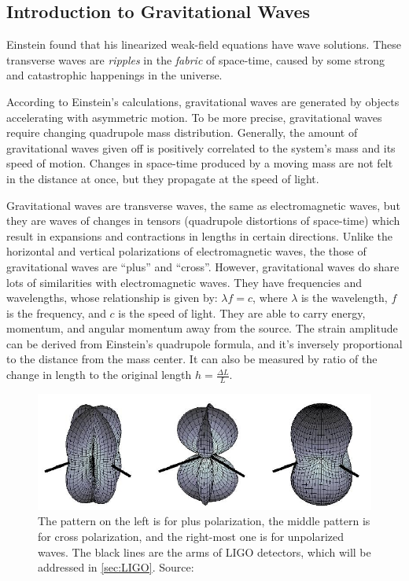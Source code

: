 \documentclass[aps,prd,preprint]{revtex4}
\begin{document}
\subsection{Introduction to Gravitational Waves}
Einstein found that his linearized weak-field equations have wave solutions. \cite{O1} These transverse waves are \emph{ripples} in the \emph{fabric} of space-time, caused by some strong and catastrophic happenings in the universe.
\par According to Einstein's calculations, gravitational waves are generated by objects accelerating with asymmetric motion. To be more precise, gravitational waves require changing quadrupole mass distribution. Generally, the amount of gravitational waves given off is positively correlated to the system's mass and its speed of motion. Changes in space-time produced by a moving mass are not felt in the distance at once, but they propagate at the speed of light. \cite{SBackground}
\par Gravitational waves are transverse waves, the same as electromagnetic waves, but they are waves of changes in tensors (quadrupole distortions of space-time) which result in expansions and contractions in lengths in certain directions. Unlike the horizontal and vertical polarizations of electromagnetic waves, the those of gravitational waves are \enquote{plus} and \enquote{cross}. However, gravitational waves do share lots of similarities with electromagnetic waves. They have frequencies and wavelengths, whose relationship is given by: $\lambda f=c$, where $\lambda$ is the wavelength, $f$ is the frequency, and $c$ is the speed of light. They are able to carry energy, momentum, and angular momentum away from the source. \cite{SBackground} The strain amplitude can be derived from Einstein's quadrupole formula, and it's inversely proportional to the distance from the mass center. \cite{relativity2} It can also be measured by ratio of the change in length to the original length $h=\frac{\Delta L}{L}$. 
\begin{figure}
	\includegraphics{G-wave_polarizations}
	\caption{The pattern on the left is for plus polarization, the middle pattern is for cross polarization, and the right-most one is for unpolarized waves. The black lines are the arms of LIGO detectors, which will be addressed in \ref{sec:LIGO}. Source: \cite{S6Run}}
\end{figure}
\end{document}
